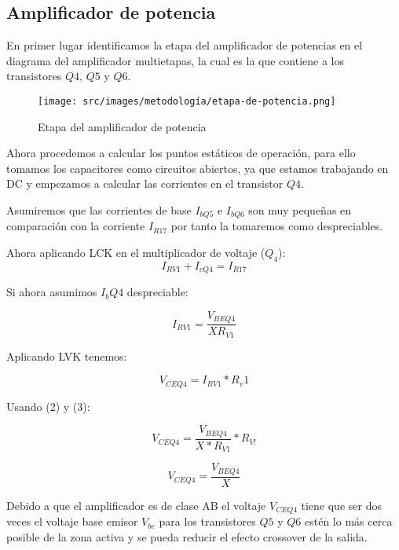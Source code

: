 \subsection{Amplificador de potencia}

En primer lugar identificamos la etapa del amplificador de potencias en el diagrama del amplificador multietapas, la cual es la que contiene a los transistores $Q4$, $Q5$ y $Q6$.

\begin{figure}[ht]
    \centering
    \texttt{[image: src/images/metodología/etapa-de-potencia.png]}
    \caption{Etapa del amplificador de potencia}
    \label{fig:met-etapa-amplificador-de-potencia}
\end{figure}

Ahora procedemos a calcular los puntos estáticos de operación, para ello tomamos los capacitores como circuitos abiertos, ya que estamos trabajando en DC y empezamos a calcular las corrientes en el transistor $Q4$.

Asumiremos que las corrientes de base $I_{bQ5}$ e $I_{bQ6}$ son muy pequeñas en comparación con la corriente $I_{R17}$ por tanto la tomaremos como despreciables.

Ahora aplicando LCK en el multiplicador de voltaje ($Q_4$):
\begin{equation}
I_{RV1} + I_{cQ4} = I_{R17}    
\end{equation}

Si ahora asumimos $I_bQ4$ despreciable:

\begin{equation}
    I_{RV1} = \frac{V_{BEQ4}}{XR_{V1}}
\end{equation}

Aplicando LVK tenemos:

\begin{equation}
    V_{CEQ4} = I_{RV1} * R_v1
\end{equation}

Usando (2) y (3):

$$ V_{CEQ4} = \frac{V_{BEQ4}}{X*R_{V1}} * R_{V!}$$

\begin{equation}
    V_{CEQ4} = \frac{V_{BEQ4}}{X}
\end{equation}

Debido a que el amplificador es de clase AB el voltaje $V_{CEQ4}$ tiene que ser dos veces el voltaje base emisor $V_{be}$ para los transistores $Q5$ y $Q6$ estén lo más cerca posible de la zona activa y se pueda reducir el efecto crossover de la salida.


